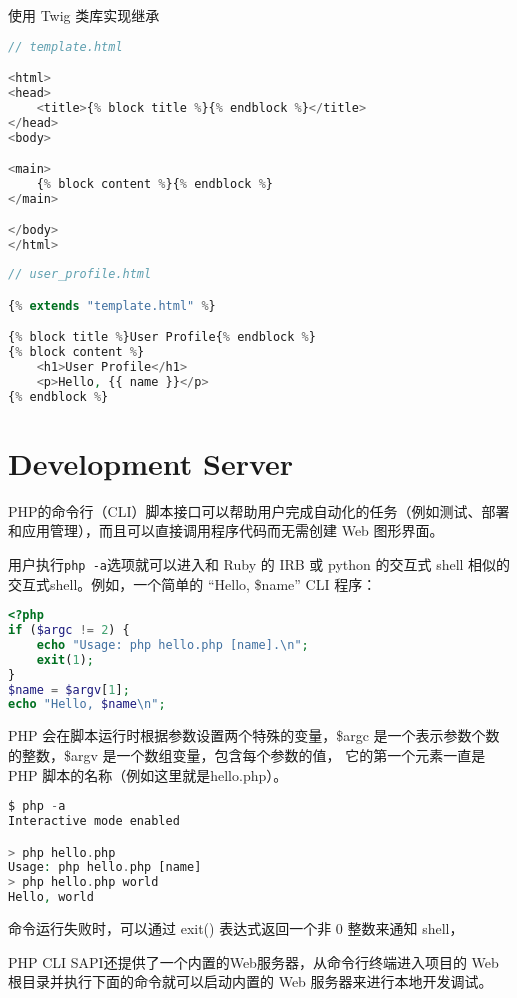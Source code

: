 \begin{example}
使用 Twig 类库实现继承
\begin{lstlisting}[language=PHP]
// template.html

<html>
<head>
    <title>{% block title %}{% endblock %}</title>
</head>
<body>

<main>
    {% block content %}{% endblock %}
</main>

</body>
</html>
\end{lstlisting}
\end{example}

\begin{lstlisting}[language=PHP]
// user_profile.html

{% extends "template.html" %}

{% block title %}User Profile{% endblock %}
{% block content %}
    <h1>User Profile</h1>
    <p>Hello, {{ name }}</p>
{% endblock %}
\end{lstlisting}


\section{Development Server}

PHP的命令行（CLI）脚本接口可以帮助用户完成自动化的任务（例如测试、部署和应用管理），而且可以直接调用程序代码而无需创建 Web 图形界面。

用户执行\texttt{php -a}选项就可以进入和 Ruby 的 IRB 或 python 的交互式 shell 相似的交互式shell。例如，一个简单的 “Hello, \$name” CLI 程序：


\begin{lstlisting}[language=PHP]
<?php
if ($argc != 2) {
    echo "Usage: php hello.php [name].\n";
    exit(1);
}
$name = $argv[1];
echo "Hello, $name\n";
\end{lstlisting}

PHP 会在脚本运行时根据参数设置两个特殊的变量，\$argc 是一个表示参数个数的整数，\$argv 是一个数组变量，包含每个参数的值， 它的第一个元素一直是 PHP 脚本的名称（例如这里就是hello.php）。

\begin{lstlisting}[language=PHP]
$ php -a
Interactive mode enabled

> php hello.php
Usage: php hello.php [name]
> php hello.php world
Hello, world
\end{lstlisting}

命令运行失败时，可以通过 exit() 表达式返回一个非 0 整数来通知 shell，

PHP CLI SAPI还提供了一个内置的Web服务器，从命令行终端进入项目的 Web 根目录并执行下面的命令就可以启动内置的 Web 服务器来进行本地开发调试。


